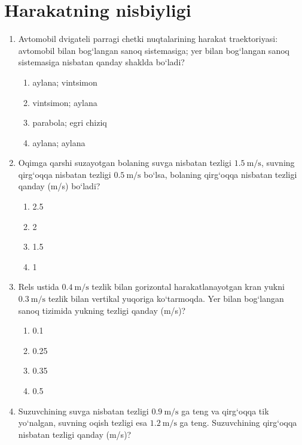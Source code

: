 \section{Harakatning nisbiyligi}

\begin{enumerate}

\item Avtomobil dvigateli parragi chetki nuqtalarining harakat traektoriyasi:
avtomobil bilan bog‘langan sanoq sistemasiga; yer bilan bog‘langan sanoq sistemasiga nisbatan qanday shaklda bo‘ladi?

\begin{enumerate}[label=\Alph*)]
\item aylana; vintsimon
\item vintsimon; aylana
\item parabola; egri chiziq
\item aylana; aylana
\end{enumerate}


\item Oqimga qarshi suzayotgan bolaning suvga nisbatan tezligi $1.5\ \text{m/s}$,
suvning qirg‘oqqa nisbatan tezligi $0.5\ \text{m/s}$ bo‘lsa,
bolaning qirg‘oqqa nisbatan tezligi qanday (m/s) bo‘ladi?

\begin{enumerate}[label=\Alph*)]
\item 2.5
\item 2
\item 1.5
\item 1

\end{enumerate}


\item Rels ustida $0.4\ \text{m/s}$ tezlik bilan gorizontal harakatlanayotgan kran
yukni $0.3\ \text{m/s}$ tezlik bilan vertikal yuqoriga ko‘tarmoqda.
Yer bilan bog‘langan sanoq tizimida yukning tezligi qanday (m/s)?

\begin{enumerate}[label=\Alph*)]
\item 0.1
\item 0.25
\item 0.35
\item 0.5

\end{enumerate}


\item Suzuvchining suvga nisbatan tezligi $0.9\ \text{m/s}$ ga teng va qirg‘oqqa tik yo‘nalgan,
suvning oqish tezligi esa $1.2\ \text{m/s}$ ga teng.
Suzuvchining qirg‘oqqa nisbatan tezligi qanday (m/s)?


\end{enumerate}
